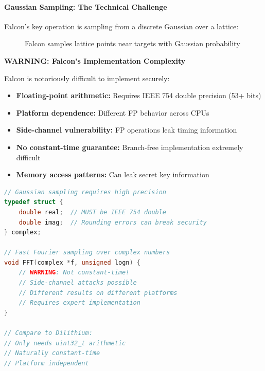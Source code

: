 \documentclass[11pt,a4paper]{article}
\begin{document}
\paragraph{Gaussian Sampling: The Technical Challenge}

Falcon's key operation is sampling from a discrete Gaussian over a lattice:

\begin{figure}[h]
\centering
{}
\caption{Falcon samples lattice points near targets with Gaussian probability}
\end{figure}

\textbf{WARNING: Falcon's Implementation Complexity}

Falcon is notoriously difficult to implement securely:
\begin{itemize}
    \item \textbf{Floating-point arithmetic:} Requires IEEE 754 double precision (53+ bits)
    \item \textbf{Platform dependence:} Different FP behavior across CPUs
    \item \textbf{Side-channel vulnerability:} FP operations leak timing information
    \item \textbf{No constant-time guarantee:} Branch-free implementation extremely difficult
    \item \textbf{Memory access patterns:} Can leak secret key information
\end{itemize}

\begin{lstlisting}[language=C, caption=Falcon's Precision Requirements - DO NOT USE IN PRODUCTION WITHOUT EXPERTISE]
// Gaussian sampling requires high precision
typedef struct {
    double real;  // MUST be IEEE 754 double
    double imag;  // Rounding errors can break security
} complex;

// Fast Fourier sampling over complex numbers
void FFT(complex *f, unsigned logn) {
    // WARNING: Not constant-time!
    // Side-channel attacks possible
    // Different results on different platforms
    // Requires expert implementation
}

// Compare to Dilithium:
// Only needs uint32_t arithmetic
// Naturally constant-time
// Platform independent
\end{lstlisting}
\end{document}
